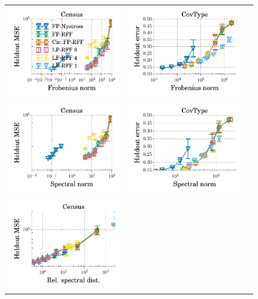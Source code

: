 \begin{figure}
	\centering
	\begin{tabular}{c c c}
		\includegraphics[width=0.4\linewidth]{figures/regression_l2_vs_f_norm_all_line.pdf} &
		\includegraphics[width=0.4\linewidth]{figures/classification_acc_vs_f_norm_all_line.pdf} \\
		\includegraphics[width=0.4\linewidth]{figures/regression_l2_vs_s_norm_all_line.pdf} &
		\includegraphics[width=0.4\linewidth]{figures/classification_acc_vs_s_norm_all_line.pdf} \\
		\includegraphics[width=0.4\linewidth]{figures/regression_l2_vs_delta_all_line.pdf} &

\end{tabular}
\end{figure}
